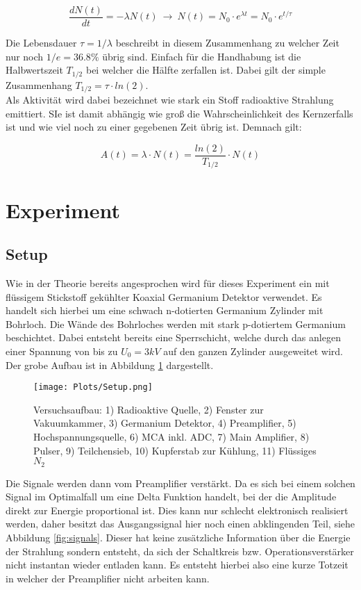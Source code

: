\documentclass[]{article}
\begin{document}
\begin{equation}
\frac{dN(t)}{dt} = - \lambda N(t) \: \rightarrow \: N(t)=N_0 \cdot e^{\lambda t} = N_0 \cdot e^{t/\tau}
\label{eq:zerfallsgesetz}
\end{equation}

Die Lebensdauer $ \tau = 1/\lambda $ beschreibt in diesem Zusammenhang zu welcher Zeit nur noch $1/e= 36.8\% $ übrig sind. Einfach für die Handhabung ist die Halbwertszeit $T_{1/2}$ bei welcher die Hälfte zerfallen ist. Dabei gilt der simple Zusammenhang $ T_{1/2 } = \tau \cdot ln(2) $. \\

Als Aktivität wird dabei bezeichnet wie stark ein Stoff radioaktive Strahlung emittiert. SIe ist damit abhängig wie groß die Wahrscheinlichkeit des Kernzerfalls ist und wie viel noch zu einer gegebenen Zeit übrig ist. Demnach gilt:

\begin{equation}
A(t) = \lambda \cdot N(t) = \frac{ln(2)}{T_{1/2}} \cdot N(t)
\label{eq:activity}
\end{equation}


\newpage
\section{Experiment}
\subsection{Setup}
Wie in der Theorie bereits angesprochen wird für dieses Experiment ein mit flüssigem Stickstoff gekühlter Koaxial Germanium Detektor verwendet. Es handelt sich hierbei um eine schwach n-dotierten Germanium Zylinder mit Bohrloch. Die Wände des Bohrloches werden mit stark p-dotiertem Germanium beschichtet. Dabei entsteht bereits eine Sperrschicht, welche durch das anlegen einer Spannung von bis zu $U_0=3kV$ auf den ganzen Zylinder ausgeweitet wird. Der grobe Aufbau ist in Abbildung \ref{fig:setup} dargestellt.

\begin{figure}[H]
\centering
\texttt{[image: Plots/Setup.png]}
\caption{Versuchsaufbau: 1) Radioaktive Quelle, 2) Fenster zur Vakuumkammer, 3) Germanium Detektor, 4) Preamplifier, 5) Hochspannungsquelle, 6) MCA inkl. ADC, 7) Main Amplifier, 8) Pulser, 9) Teilchensieb, 10) Kupferstab zur Kühlung, 11) Flüssiges $N_2$  }
\label{fig:setup}
\end{figure}

Die Signale werden dann vom Preamplifier verstärkt. Da es sich bei einem solchen Signal im Optimalfall um eine Delta Funktion handelt, bei der die Amplitude direkt zur Energie proportional ist. Dies kann nur schlecht elektronisch realisiert werden, daher besitzt das Ausgangssignal hier noch einen abklingenden Teil, siehe Abbildung \ref{fig:signals}. Dieser hat keine zusätzliche Information über die Energie der Strahlung sondern entsteht, da sich der Schaltkreis bzw. Operationsverstärker nicht instantan wieder entladen kann. Es entsteht hierbei also eine kurze Totzeit in welcher der Preamplifier nicht arbeiten kann. 
\end{document}
